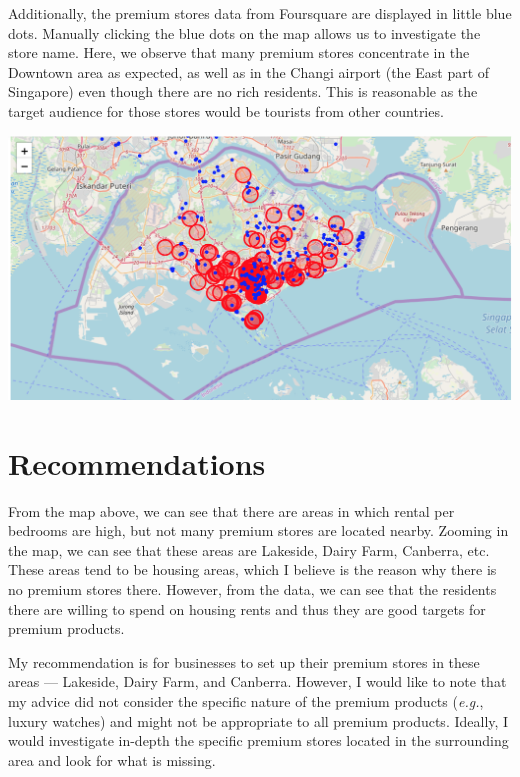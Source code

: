 \documentclass[oneside,11pt]{article}
\newcommand{\eg}{\textit{e.g.}, }
\begin{document}
Additionally, the premium stores data from Foursquare are displayed 
in little blue dots. Manually clicking the blue dots on the map allows
us to investigate the store name. Here, we observe that many premium
stores concentrate in the Downtown area as expected, 
as well as in the Changi airport (the East part of Singapore)
even though there are no rich residents. 
This is reasonable as the target audience for those stores would be
tourists from other countries.

    \begin{center}
        \includegraphics[width=0.96\columnwidth]{../Capstone_Project.png}
    \end{center}

\section{Recommendations}

From the map above, we can see that there are areas in which 
rental per bedrooms are high, but not many premium stores 
are located nearby. Zooming in the map, we can see that these
areas are Lakeside, Dairy Farm, Canberra, etc. These areas 
tend to be housing areas, which I believe is the reason 
why there is no premium stores there. However, from the data,
we can see that the residents there are willing to spend 
on housing rents and thus they are good targets for premium 
products.

My recommendation is for businesses to set up their premium 
stores in these areas --- Lakeside, Dairy Farm, and Canberra.
However, I would like to note that my advice did not consider
the specific nature of the premium products (\eg luxury watches)
and might not be appropriate to all premium products. Ideally,
I would investigate in-depth the specific premium stores located
in the surrounding area and look for what is missing.
\end{document}
